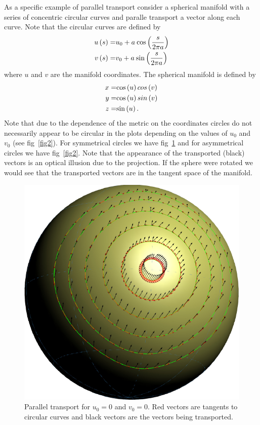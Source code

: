 As a specific example of parallel transport consider a spherical manifold with a series of concentric circular curves and
paralle transport a vector along each curve.  Note that the circular curves are defined by 
\begin{align*}
	{u}\left ( {s} \right ) =& u_{0}+a\:{\cos}\left ( {\displaystyle\frac{s}{2\pi a}} \right ) \\
	{v}\left ( {s} \right ) =& v_{0}+a\:{\sin}\left ( {\displaystyle\frac{s}{2\pi a}} \right ) 
\end{align*}
where $u$ and $v$ are the manifold coordinates. The spherical manifold is defined by
\begin{align*}
	x =& {\cos}\left ( {u} \right ){cos}\left ( {v} \right ) \\
	y =& {\cos}\left ( {u} \right ){sin}\left ( {v} \right ) \\
	z =& {\sin}\left ( {u} \right ). 
\end{align*}
Note that due to the dependence of the metric on the coordinates circles do not necessarily appear to be circular in the plots
depending on the values of $u_{0}$ and $v_{0}$ (see fig~\ref{fig2}). For symmetrical circles we have fig~\ref{fig1} 
and for asymmetrical circles we have fig~\ref{fig2}.  Note that the appearance of the transported (black) vectors is an optical
illusion due to the projection.  If the sphere were rotated we would see that the transported vectors are in the tangent 
space of the manifold.
\begin{figure}[h]
	\begin{center}
	\includegraphics[scale=1]{parallel_transport1} 
	\end{center}
	\caption{Parallel transport for $u_{0}=0$ and $v_{0}=0$. Red vectors are tangents to circular curves and black vectors
	are the vectors being transported.}\label{fig1}
\end{figure}
